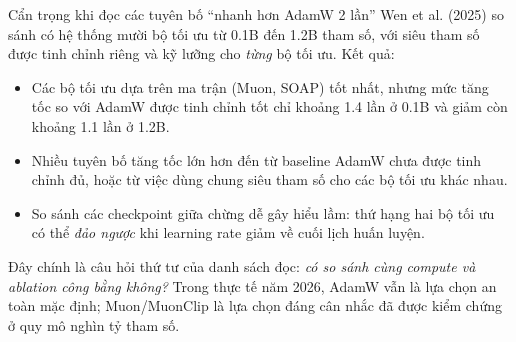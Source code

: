 \begin{pitfall}{Cẩn trọng khi đọc các tuyên bố “nhanh hơn AdamW 2 lần”}
Wen et al. (2025) \cite{wen2025fantastic} so sánh có hệ thống mười bộ tối ưu từ 0.1B đến 1.2B tham số, với siêu tham số được tinh chỉnh riêng và kỹ lưỡng cho \emph{từng} bộ tối ưu. Kết quả:
\begin{itemize}
	\item Các bộ tối ưu dựa trên ma trận (Muon, SOAP) tốt nhất, nhưng mức tăng tốc so với AdamW được tinh chỉnh tốt chỉ khoảng 1.4 lần ở 0.1B và giảm còn khoảng 1.1 lần ở 1.2B.
	\item Nhiều tuyên bố tăng tốc lớn hơn đến từ baseline AdamW chưa được tinh chỉnh đủ, hoặc từ việc dùng chung siêu tham số cho các bộ tối ưu khác nhau.
	\item So sánh các checkpoint giữa chừng dễ gây hiểu lầm: thứ hạng hai bộ tối ưu có thể \emph{đảo ngược} khi learning rate giảm về cuối lịch huấn luyện.
\end{itemize}
Đây chính là câu hỏi thứ tư của danh sách đọc: \emph{có so sánh cùng compute và ablation công bằng không?} Trong thực tế năm 2026, AdamW vẫn là lựa chọn an toàn mặc định; Muon/MuonClip là lựa chọn đáng cân nhắc đã được kiểm chứng ở quy mô nghìn tỷ tham số.
\end{pitfall}

